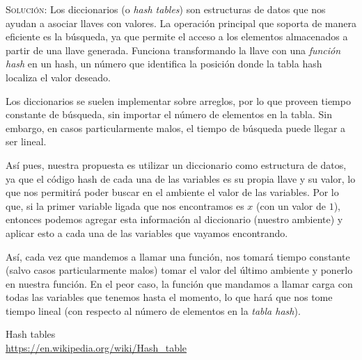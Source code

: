 \documentclass[letterpaper,11pt]{article}
\begin{document}
\begin{enumerate}
\begin{enumerate}
        \textsc{Solución:} Los diccionarios (o \textit{hash tables}) son 
        estructuras de datos que nos ayudan a asociar llaves con valores. 
        La operación principal que soporta de manera eficiente es la 
        búsqueda, ya que permite el acceso a los elementos almacenados a partir 
        de una llave generada. Funciona transformando la llave con una 
        \textit{función hash} en un hash, un número que identifica la posición 
        donde la tabla hash localiza el valor deseado. 

        Los diccionarios se suelen implementar sobre arreglos, por lo que proveen
        tiempo constante de búsqueda, sin importar el número de elementos en la
        tabla. Sin embargo, en casos particularmente malos, el tiempo de búsqueda 
        puede llegar a ser lineal.

        Así pues, nuestra propuesta es utilizar un diccionario como estructura 
        de datos, ya que el código hash de cada una de las variables es su 
        propia llave y su valor, lo que nos permitirá poder buscar en el 
        ambiente el valor de las variables. Por lo que, si la primer variable 
        ligada que nos encontramos es $x$ (con un valor de $1$), entonces 
        podemos agregar esta información al diccionario (nuestro ambiente) y 
        aplicar esto a cada una de las variables que vayamos encontrando.

        Así, cada vez que mandemos a llamar una función, nos tomará tiempo 
        constante (salvo casos particularmente malos) tomar el valor del último 
        ambiente y ponerlo en nuestra función. En el peor caso, la función que 
        mandamos a llamar carga con todas las variables que tenemos hasta el 
        momento, lo que hará que nos tome tiempo lineal (con respecto al número 
        de elementos en la \textit{tabla hash}).

   \end{enumerate}
\end{enumerate}

\begin{thebibliography}{2}
  Hash tables \\
  \url{https://en.wikipedia.org/wiki/Hash_table}
\end{thebibliography}
\end{document}
